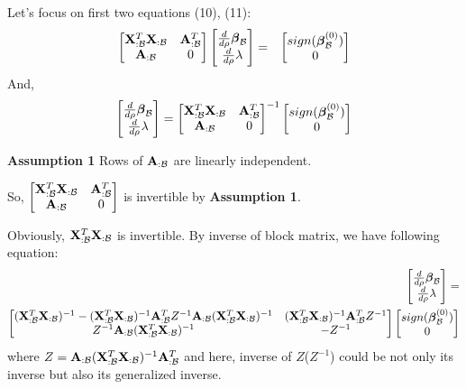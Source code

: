 \documentclass{article}
\newcommand{\bA}{{\bf A}}
\newcommand{\bX}{{\bf X}}
\newcommand{\bbeta}{\mbox{\boldmath{$\beta$}}}
\newcommand{\bea}{\begin{eqnarray}}
\newcommand{\eea}{\end{eqnarray}}
\begin{document}
Let's focus on first two equations (10), (11):
\bea
\begin{bmatrix} 
\bX_{:\mathcal{B}}^T \bX_{:\mathcal{B}} & \bA_{:\mathcal{B}}^T  \\
\bA_{:\mathcal{B}} & 0
\end{bmatrix}
\begin{bmatrix}
\frac{d}{d\rho}\bbeta_{\mathcal{B}} \\
\frac{d}{d\rho}\lambda
\end{bmatrix}
&=& 
\begin{bmatrix}
sign(\bbeta_{\mathcal{B}}^{(0)}) \\
0
\end{bmatrix} 
\eea
And, 
\bea
\begin{bmatrix}
\frac{d}{d\rho}\bbeta_{\mathcal{B}} \\
\frac{d}{d\rho}\lambda
\end{bmatrix}
=
\begin{bmatrix} 
\bX_{:\mathcal{B}}^T \bX_{:\mathcal{B}} & \bA_{:\mathcal{B}}^T  \\
\bA_{:\mathcal{B}} & 0
\end{bmatrix}^{-1}
\begin{bmatrix}
sign(\bbeta_{\mathcal{B}}^{(0)}) \\
0
\end{bmatrix} 
\eea

\bigskip
\textbf{Assumption 1}
Rows of $\bA_{:\mathcal{B}}$ are linearly independent. 

\bigskip
So,
$\begin{bmatrix} 
\bX_{:\mathcal{B}}^T \bX_{:\mathcal{B}} & \bA_{:\mathcal{B}}^T  \\
\bA_{:\mathcal{B}} & 0
\end{bmatrix}$
is invertible by \textbf{Assumption 1}.

\medskip
Obviously, $\bX_{:\mathcal{B}}^T \bX_{:\mathcal{B}}$ is invertible.
By inverse of block matrix, we have following equation:
\bea
\begin{bmatrix}
\frac{d}{d\rho}\bbeta_{\mathcal{B}} \\
\frac{d}{d\rho}\lambda
\end{bmatrix} 
= \nonumber \\
\begin{bmatrix}
(\bX_{:\mathcal{B}}^T \bX_{:\mathcal{B}})^{-1} - (\bX_{:\mathcal{B}}^T \bX_{:\mathcal{B}})^{-1} \bA_{:\mathcal{B}}^T Z^{-1} \bA_{:\mathcal{B}} (\bX_{:\mathcal{B}}^T \bX_{:\mathcal{B}})^{-1} & (\bX_{:\mathcal{B}}^T \bX_{:\mathcal{B}})^{-1} \bA_{:\mathcal{B}}^T Z^{-1} \\
Z^{-1} \bA_{:\mathcal{B}} (\bX_{:\mathcal{B}}^T \bX_{:\mathcal{B}})^{-1} & - Z^{-1} \\
\end{bmatrix} 
\begin{bmatrix}
sign(\bbeta_{\mathcal{B}}^{(0)}) \\
0
\end{bmatrix} 
\eea
where $Z = \bA_{:\mathcal{B}} (\bX_{:\mathcal{B}}^T \bX_{:\mathcal{B}})^{-1} \bA_{:\mathcal{B}}^T$ and here, inverse of $Z$($Z^{-1}$) could be not only its inverse but also its generalized inverse.
\end{document}

